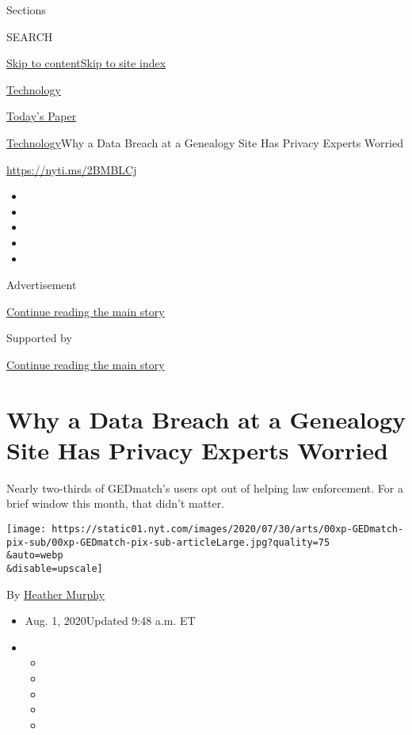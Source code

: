 Sections

SEARCH

\protect\hyperlink{site-content}{Skip to
content}\protect\hyperlink{site-index}{Skip to site index}

\href{https://www.nytimes.com/section/technology}{Technology}

\href{https://myaccount.nytimes.com/auth/login?response_type=cookie\&client_id=vi}{}

\href{https://www.nytimes.com/section/todayspaper}{Today's Paper}

\href{/section/technology}{Technology}\textbar{}Why a Data Breach at a
Genealogy Site Has Privacy Experts Worried

\url{https://nyti.ms/2BMBLCj}

\begin{itemize}
\item
\item
\item
\item
\item
\end{itemize}

Advertisement

\protect\hyperlink{after-top}{Continue reading the main story}

Supported by

\protect\hyperlink{after-sponsor}{Continue reading the main story}

\hypertarget{why-a-data-breach-at-a-genealogy-site-has-privacy-experts-worried}{%
\section{Why a Data Breach at a Genealogy Site Has Privacy Experts
Worried}\label{why-a-data-breach-at-a-genealogy-site-has-privacy-experts-worried}}

Nearly two-thirds of GEDmatch's users opt out of helping law
enforcement. For a brief window this month, that didn't matter.

\texttt{[image: https://static01.nyt.com/images/2020/07/30/arts/00xp-GEDmatch-pix-sub/00xp-GEDmatch-pix-sub-articleLarge.jpg?quality=75\\\&auto=webp\\\&disable=upscale]}

By \href{https://www.nytimes.com/by/heather-murphy}{Heather Murphy}

\begin{itemize}
\item
  Aug. 1, 2020Updated 9:48 a.m. ET
\item
  \begin{itemize}
  \item
  \item
  \item
  \item
  \item
  \end{itemize}
\end{itemize}

